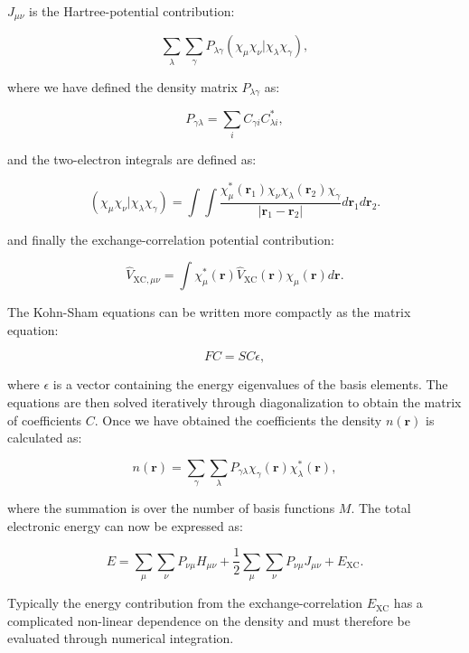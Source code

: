 $J_{\mu\nu}$ is the Hartree-potential contribution:

\begin{equation}
    \sum_{\lambda} \sum_{\gamma} P_{\lambda\gamma}
    \left(\chi_{\mu}\chi_{\nu} | \chi_{\lambda}\chi_{\gamma}\right) ,
\end{equation}

where we have defined the density matrix $P_{\lambda\gamma}$ as:

\begin{equation}
P_{\gamma\lambda} = \sum_i C_{\gamma i} C_{\lambda i}^* ,
\end{equation}

and the two-electron integrals are defined as:

\begin{equation}
\left(\chi_{\mu}\chi_{\nu} | \chi_{\lambda}\chi_{\gamma}\right)
    = \int \int \frac{\chi_{\mu}^*(\bm{r}_1) \chi_{\nu}
    \chi_{\lambda}(\bm{r}_2) \chi_{\gamma}}
    {\left| \bm{r}_1 - \bm{r}_2 \right|}
    d\bm{r}_1 d\bm{r}_2 .
\end{equation}

and finally the exchange-correlation potential contribution:

\begin{equation}
\hat{V}_{\text{XC},\mu\nu} = \int \chi_{\mu}^*(\bm{r})
    \hat{V}_{\text{XC}}(\bm{r}) \chi_{\mu}(\bm{r}) d\bm{r} .
\end{equation}

The Kohn-Sham equations can be written more compactly as the matrix equation:

$$ FC = SC\epsilon , $$

where $\epsilon$ is a vector containing the energy eigenvalues
of the basis elements. The equations are then solved
iteratively through diagonalization to obtain
the matrix of coefficients $C$. Once we have obtained the 
coefficients the density $n(\bm{r})$ is calculated as:

$$ n(\bm{r}) = \sum_{\gamma} \sum_{\lambda} P_{\gamma\lambda}
    \chi_{\gamma}(\bm{r}) \chi_{\lambda}^*(\bm{r}) , $$

where the summation is over the number of basis functions $M$.
The total electronic energy can now be expressed
as:

\begin{equation}
E = \sum_{\mu} \sum_{\nu} P_{\nu\mu} H_{\mu\nu}
    +\frac{1}{2} \sum_{\mu} \sum_{\nu} P_{\nu\mu}
    J_{\mu\nu}
    + E_{\text{XC}} .
\end{equation}

Typically the energy contribution from the exchange-correlation
$E_{\text{XC}}$ has a complicated non-linear dependence on the
density and must therefore be evaluated through
numerical integration.
